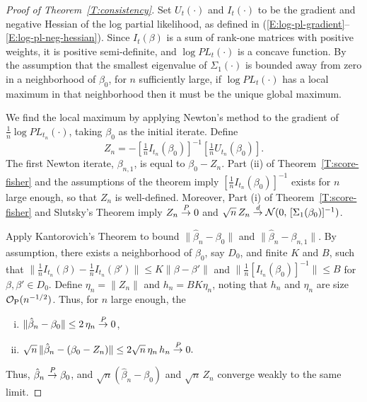 \documentclass[final]{statsoc}
\begin{document}
\begin{proof}[Proof of Theorem~\ref{T:consistency}]
Set $U_t(\cdot)$ and $I_t(\cdot)$ to be the gradient and negative
Hessian of the log partial likelihood, as defined in
(\ref{E:log-pl-gradient}--\ref{E:log-pl-neg-hessian}).  Since
$I_t(\beta)$ is a sum of rank-one matrices with positive weights,
it is positive semi-definite, and $\log \mathit{PL}_t(\cdot)$ is
a concave function.  By the assumption that the smallest
eigenvalue of $\Sigma_1(\cdot)$ is bounded away from zero in a neighborhood
of $\beta_0$, for $n$ sufficiently large, if $\log \mathit{PL}_t(\cdot)$ has a
local maximum in that neighborhood then it must be the unique global maximum.

We find the local maximum by applying Newton's method to the
gradient of $\tfrac{1}{n} \log \mathit{PL}_{t_n}(\cdot)$, taking
$\beta_0$ as the initial iterate.  Define
\[
   Z_n = -[\tfrac{1}{n} I_{t_n}(\beta_0)]^{-1} [ \tfrac{1}{n} U_{t_n}(\beta_0)].
\]
The first Newton iterate, $\beta_{n,1}$, is equal to $\beta_0 - Z_n$.
Part (ii) of Theorem~\ref{T:score-fisher} and the
assumptions of the theorem imply $[\tfrac{1}{n} I_{t_n}(\beta_0)]^{-1}$
exists for $n$ large enough, so that $Z_n$ is well-defined.
Moreover, Part (i) of Theorem~\ref{T:score-fisher} and Slutsky's Theorem imply
$Z_n \overset{\mathit{P}}{\to} 0$ and
$\sqrt{n} \, Z_n \overset{\mathit{d}}{\to} \mathcal{N}(0,\, [\Sigma_1(\beta_0)]^{-1})$.


Apply Kantorovich's Theorem to bound $\| \hat \beta_n - \beta_0 \|$
and $\| \hat \beta_n - \beta_{n,1} \|$.  By assumption, there exists
a neighborhood of $\beta_0$, say $D_0$, and finite $K$ and $B$, such that
\(
    \|
        \frac{1}{n} I_{t_n} (\beta)
        -
        \frac{1}{n} I_{t_n}(\beta')
    \|
    \leq
    K
    \|
        \beta
        -
        \beta'
    \|
\)
and
\(
    \| \frac{1}{n} [I_{t_n}(\beta_0)]^{-1} \| \leq B
\)
for $\beta, \beta' \in D_0$.
Define $\eta_n = \| Z_n \|$ and $h_n = B K \eta_n$, noting that $h_n$ and
$\eta_n$ are size $\mathcal{O}_\text{P}(n^{-1/2})$.  Thus, for $n$ large enough, the
\begin{enumerate}[(i)]
    \item $\| \hat \beta_n - \beta_0 \| \leq 2 \, \eta_n \overset{\mathit{P}}{\to} 0$,
    \item
        \(
            \sqrt{n} \, \| \hat \beta_n - (\beta_0 - Z_n) \|
            \leq
            2 \sqrt{n} \, \eta_n \, h_n
            \overset{\mathit{P}}{\to} 0.
        \)
\end{enumerate}
Thus, $\hat \beta_n \overset{\mathit{P}}{\to} \beta_0$, and $\sqrt{n} (\hat \beta_n - \beta_0)$
and $\sqrt{n} \, Z_n$ converge weakly to the same limit.
\end{proof}
\end{document}
